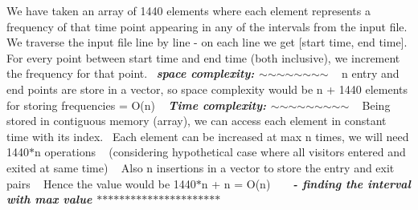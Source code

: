 We have taken an array of 1440 elements where each element represents a frequency of that time point appearing in any of the intervals from the input file. We traverse the input file line by line -\/ on each line we get \mbox{[}start time, end time\mbox{]}. For every point between start time and end time (both inclusive), we increment the frequency for that point.~\newline
 {\bfseries{{\itshape space complexity\+: \texorpdfstring{$\sim$}{\string~}\texorpdfstring{$\sim$}{\string~}\texorpdfstring{$\sim$}{\string~}\texorpdfstring{$\sim$}{\string~}\texorpdfstring{$\sim$}{\string~}\texorpdfstring{$\sim$}{\string~}\texorpdfstring{$\sim$}{\string~}\texorpdfstring{$\sim$}{\string~}}}} ~\newline
n entry and end points are store in a vector, so space complexity would be n + 1440 elements for storing frequencies = O(n) ~\newline
 {\bfseries{{\itshape Time complexity\+: \texorpdfstring{$\sim$}{\string~}\texorpdfstring{$\sim$}{\string~}\texorpdfstring{$\sim$}{\string~}\texorpdfstring{$\sim$}{\string~}\texorpdfstring{$\sim$}{\string~}\texorpdfstring{$\sim$}{\string~}\texorpdfstring{$\sim$}{\string~}\texorpdfstring{$\sim$}{\string~}\texorpdfstring{$\sim$}{\string~}}}} ~\newline
Being stored in contiguous memory (array), we can access each element in constant time with its index.~\newline
Each element can be increased at max n times, we will need 1440\texorpdfstring{$\ast$}{*}n operations ~\newline
(considering hypothetical case where all visitors entered and exited at same time) ~\newline
Also n insertions in a vector to store the entry and exit pairs ~\newline
Hence the value would be 1440\texorpdfstring{$\ast$}{*}n + n = O(n) ~\newline
~\newline
{\bfseries{{\itshape  -\/ finding the interval with max value \texorpdfstring{$\ast$}{*}\texorpdfstring{$\ast$}{*}\texorpdfstring{$\ast$}{*}\texorpdfstring{$\ast$}{*}\texorpdfstring{$\ast$}{*}\texorpdfstring{$\ast$}{*}\texorpdfstring{$\ast$}{*}\texorpdfstring{$\ast$}{*}\texorpdfstring{$\ast$}{*}\texorpdfstring{$\ast$}{*}\texorpdfstring{$\ast$}{*}\texorpdfstring{$\ast$}{*}\texorpdfstring{$\ast$}{*}\texorpdfstring{$\ast$}{*}\texorpdfstring{$\ast$}{*}\texorpdfstring{$\ast$}{*}\texorpdfstring{$\ast$}{*}\texorpdfstring{$\ast$}{*}\texorpdfstring{$\ast$}{*}\texorpdfstring{$\ast$}{*}\texorpdfstring{$\ast$}{*}\texorpdfstring{$\ast$}{*}}}} ~\newline
